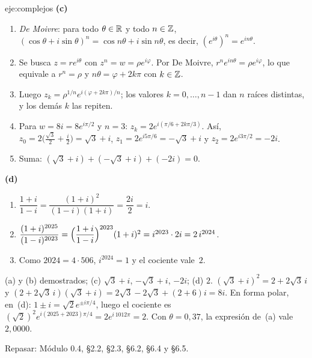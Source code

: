 \begin{solucion}{eje:complejos}
\noindent\textbf{(c)}
\begin{enumerate}[label=\arabic*.]
  \item \emph{De Moivre}: para todo $\theta\in\mathbb{R}$ y todo $n\in\mathbb{Z}$, $(\cos\theta+i\sin\theta)^{n}=\cos n\theta+i\sin n\theta$, es decir, $(e^{i\theta})^{n}=e^{in\theta}$.
  \item Se busca $z=re^{i\theta}$ con $z^{n}=w=\rho e^{i\varphi}$. Por De Moivre, $r^{n}e^{in\theta}=\rho e^{i\varphi}$, lo que equivale a $r^{n}=\rho$ y $n\theta=\varphi+2k\pi$ con $k\in\mathbb{Z}$.
  \item Luego $z_k=\rho^{1/n}e^{i(\varphi+2k\pi)/n}$; los valores $k=0,\dots,n-1$ dan $n$ raíces distintas, y los demás $k$ las repiten.
  \item Para $w=8i=8e^{i\pi/2}$ y $n=3$: $z_k=2e^{i(\pi/6+2k\pi/3)}$. Así, $z_0=2\bigl(\frac{\sqrt3}{2}+\frac i2\bigr)=\sqrt3+i$, $z_1=2e^{i5\pi/6}=-\sqrt3+i$ y $z_2=2e^{i3\pi/2}=-2i$.
  \item Suma: $(\sqrt3+i)+(-\sqrt3+i)+(-2i)=0$.
\end{enumerate}

\noindent\textbf{(d)}
\begin{enumerate}[label=\arabic*.]
  \item $\dfrac{1+i}{1-i}=\dfrac{(1+i)^{2}}{(1-i)(1+i)}=\dfrac{2i}{2}=i$.
  \item $\dfrac{(1+i)^{2025}}{(1-i)^{2023}}=\Bigl(\dfrac{1+i}{1-i}\Bigr)^{2023}(1+i)^{2}=i^{2023}\cdot2i=2\,i^{2024}$.
  \item Como $2024=4\cdot506$, $i^{2024}=1$ y el cociente vale~$2$.
\end{enumerate}
\resultado (a) y (b) demostrados; (c) $\sqrt3+i$, $-\sqrt3+i$, $-2i$; (d) $2$.
\comprobacion $(\sqrt3+i)^{2}=2+2\sqrt3\,i$ y $(2+2\sqrt3\,i)(\sqrt3+i)=2\sqrt3-2\sqrt3+(2+6)i=8i$. En forma polar, en~(d): $1\pm i=\sqrt2e^{\pm i\pi/4}$, luego el cociente es $(\sqrt2)^{2}e^{i(2025+2023)\pi/4}=2e^{i\,1012\pi}=2$. Con $\theta=0{,}37$, la expresión de~(a) vale $2{,}0000$.


\noindent Repasar: Módulo 0.4, §2.2, §2.3, §6.2, §6.4 y §6.5.
\end{solucion}

